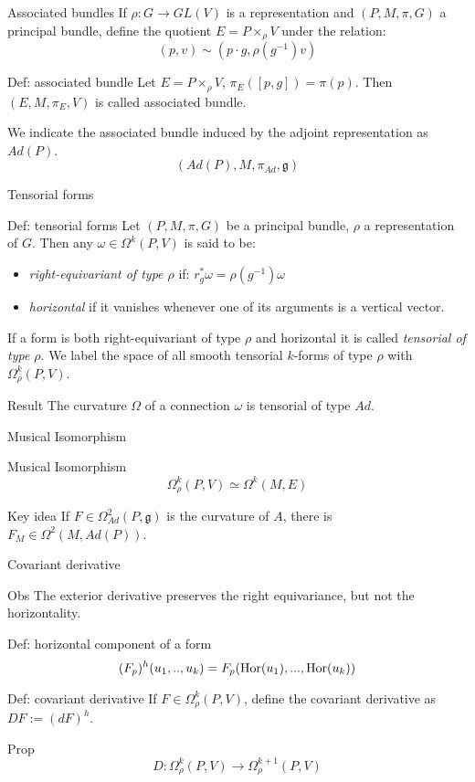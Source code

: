 \documentclass{beamer}
\begin{document}
\begin{frame}{Associated bundles}
	If $\rho:G\rightarrow GL(V)$ is a representation and $(P,M,\pi,G)$ a principal bundle, define the quotient $E=P\times_\rho V$
	under the relation:
	$$(p,v)\sim(p\cdot g, \rho(g^{-1})v)$$
	\begin{exampleblock}{Def: associated bundle}
			Let $E=P\times_\rho V$, $\pi_E([p,g])=\pi(p)$. Then  $(E,M,\pi_E,V)$ is called associated bundle.
	\end{exampleblock}
		We indicate the associated bundle induced by the adjoint representation as $Ad(P)$.
		$$(Ad(P),M,\pi_{Ad},\mathfrak{g})$$
\end{frame}
\begin{frame}{Tensorial forms}
	\begin{exampleblock}{Def: tensorial forms}
		Let $(P,M,\pi,G)$ be a principal bundle, $\rho$ a representation of $G$. Then any $\omega\in\Omega^k(P,V)$ is said to be:
		\begin{itemize}
			\item \textit{right-equivariant of type $\rho$} if:
			$r^*_g\omega=\rho(g^{-1})\omega$
			\item \textit{horizontal} if it vanishes whenever one of its arguments is a vertical vector. 
		\end{itemize} If a form is both right-equivariant of type $\rho$ and horizontal it is called \textit{tensorial of type $\rho$}. We label the space of all smooth tensorial $k$-forms of type $\rho$ with $\Omega^k_\rho(P,V)$.
	\end{exampleblock}
	\begin{block}{Result}
		The curvature $\Omega$ of a connection $\omega$ is tensorial of type $Ad$.
	\end{block}
\end{frame}
\begin{frame}{Musical Isomorphism}
	\begin{alertblock}{Musical Isomorphism}
		$$\Omega^k_\rho(P,V)\simeq\Omega^k(M,E)$$
	\end{alertblock}
	\begin{alertblock}{Key idea}
		If $F\in\Omega^2_{Ad}(P,\mathfrak{g})$ is the curvature of $A$, there is $F_M\in\Omega^2(M,Ad(P))$.
	\end{alertblock}
\end{frame}
\begin{frame}{Covariant derivative}
	\begin{block}{Obs}
		The exterior derivative preserves the right equivariance, but not the horizontality.
	\end{block}
	\begin{exampleblock}{Def: horizontal component of a form}
		$$(F_p)^h(u_1,..,u_k)=F_p(\hbox{Hor}(u_1),...,\hbox{Hor}(u_k))$$
	\end{exampleblock}
	\begin{exampleblock}{Def: covariant derivative}
		If $F\in\Omega^k_\rho(P,V)$, define the covariant derivative as $DF:=(dF)^h$.
	\end{exampleblock}
	\begin{alertblock}{Prop}
		$$D:\Omega^k_\rho(P,V)\rightarrow \Omega^{k+1}_\rho(P,V)$$
	\end{alertblock}
\end{frame}
\end{document}
